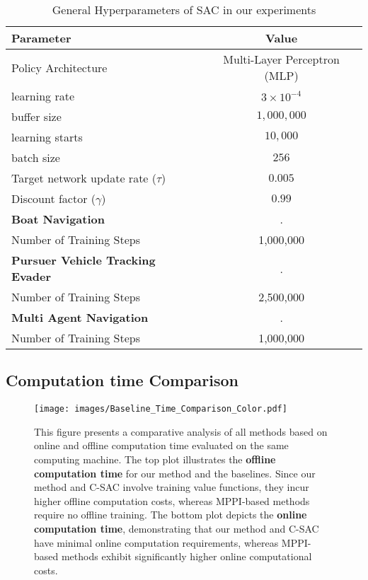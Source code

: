 \begin{table}[h]
    \centering
    \begin{tabular}{lc}
        \hline
        \textbf{Parameter} & \textbf{Value} \\
        \hline
        Policy Architecture & Multi-Layer Perceptron (MLP) \\
        learning rate & $3 \times 10^{-4}$  \\
        buffer size & $1,000,000$  \\
        learning starts & $10,000$  \\
        batch size & $256$  \\
        Target network update rate ($\tau$) & $0.005$  \\
        Discount factor ($\gamma$) & $0.99$  \\
        \hline
        \textbf{Boat Navigation} & .\\
        \hline
        Number of Training Steps & 1,000,000 \\
        \hline
        \textbf{Pursuer Vehicle Tracking Evader} & .\\
        \hline
        Number of Training Steps & 2,500,000 \\
        \hline
        \textbf{Multi Agent Navigation} & .\\
        \hline
        Number of Training Steps & 1,000,000 \\
        \hline
    \end{tabular}
    \vspace{1em}
    \caption{General Hyperparameters of SAC in our experiments}
    \label{tab:sac_general_params}
\end{table}

\subsection{Computation time Comparison} \label{app: comp_time}

\begin{figure*}[h]
    \centering
    \texttt{[image: images/Baseline\_Time\_Comparison\_Color.pdf]}
    \vspace{-0.8em}
\caption{This figure presents a comparative analysis of all methods based on online and offline computation time evaluated on the same computing machine. The top plot illustrates the \textbf{offline computation time} for our method and the baselines. Since our method and C-SAC involve training value functions, they incur higher offline computation costs, whereas MPPI-based methods require no offline training. The bottom plot depicts the \textbf{online computation time}, demonstrating that our method and C-SAC have minimal online computation requirements, whereas MPPI-based methods exhibit significantly higher online computational costs.} 
\label{fig: baseline_time_comparison}
\vspace{-1.0em}
\end{figure*}

